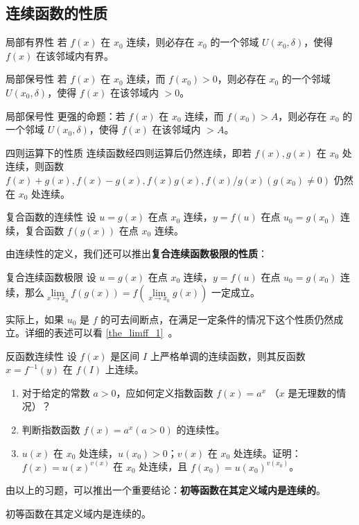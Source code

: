 \subsection{连续函数的性质}
\begin{theorem}{局部有界性}
若 $f(x)$ 在 $x_0$ 连续，则必存在 $x_0$ 的一个邻域 $U(x_0,\delta)$，使得 $f(x)$ 在该邻域内有界。
\end{theorem}
\begin{theorem}{局部保号性}
若 $f(x)$ 在 $x_0$ 连续，而 $f(x_0)>0$，则必存在 $x_0$ 的一个邻域 $U(x_0,\delta)$，使得 $f(x)$ 在该邻域内 $>0$。
\end{theorem}
\begin{theorem}{局部保号性}
更强的命题：若 $f(x)$ 在 $x_0$ 连续，而 $f(x_0)>A$，则必存在 $x_0$ 的一个邻域 $U(x_0,\delta)$，使得 $f(x)$ 在该邻域内 $>A$。
\end{theorem}
\begin{theorem}{四则运算下的性质}
连续函数经四则运算后仍然连续，即若 $f(x),g(x)$ 在 $x_0$ 处连续，则函数 $f(x)+g(x),f(x)-g(x),f(x)g(x),f(x)/g(x)(g(x_0)\neq 0)$ 仍然在 $x_0$ 处连续。
\end{theorem}

\begin{theorem}{复合函数的连续性}
设 $u=g(x)$ 在点 $x_0$ 连续，$y=f(u)$ 在点 $u_0=g(x_0)$ 连续，复合函数 $f(g(x))$ 在点 $x_0$ 连续。
\end{theorem}

由连续性的定义，我们还可以推出\textbf{复合连续函数极限的性质}：
\begin{theorem}{复合连续函数极限}
设 $u=g(x)$ 在点 $x_0$ 连续，$y=f(u)$ 在点 $u_0=g(x_0)$ 连续，那么$\lim\limits_{x\rightarrow x_0}f(g(x))=f(\lim\limits_{x\rightarrow x_0}g(x))$ 一定成立。
\end{theorem}


实际上，如果 $u_0$ 是 $f$ 的可去间断点，在满足一定条件的情况下这个性质仍然成立。详细的表述可以看 \autoref{the_limff_1}~。

\begin{theorem}{反函数连续性}
设 $f(x)$ 是区间 $I$ 上严格单调的连续函数，则其反函数 $x=f^{-1}(y)$ 在 $f(I)$ 上连续。
\end{theorem}

\begin{exercise}{}
\begin{enumerate}
\item 对于给定的常数 $a>0$，应如何定义指数函数 $f(x)=a^x$ （$x$ 是无理数的情况）？
\item 判断指数函数 $f(x)=a^x(a>0)$ 的连续性。
\item $u(x)$ 在 $x_0$ 处连续，$u(x_0)>0$；$v(x)$ 在 $x_0$ 处连续。证明： $f(x)=u(x)^{v(x)}$ 在 $x_0$ 处连续，且 $f(x_0)=u(x_0)^{v(x_0)}$。
\end{enumerate}

由以上的习题，可以推出一个重要结论：\textbf{初等函数在其定义域内是连续的}。
\end{exercise}
\begin{theorem}{}
初等函数在其定义域内是连续的。
\end{theorem}